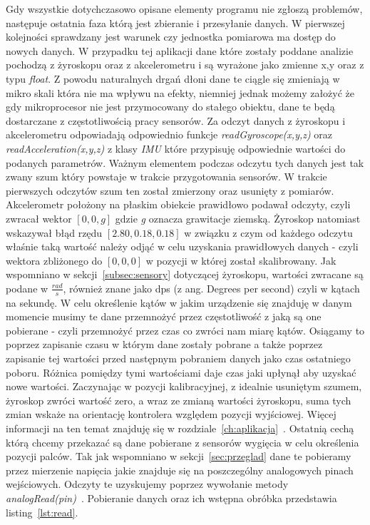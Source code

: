 Gdy wszystkie dotychczasowo opisane elementy programu nie zgłoszą problemów, następuje ostatnia faza którą jest zbieranie i przesyłanie danych. W pierwszej kolejności sprawdzany jest warunek czy jednostka pomiarowa ma dostęp do nowych danych. W przypadku tej aplikacji dane które zostały poddane analizie pochodzą z żyroskopu oraz z akcelerometru i są wyrażone jako zmienne x,y oraz z typu \textit{float}. Z powodu naturalnych drgań dłoni dane te ciągle się zmieniają w mikro skali która nie ma wpływu na efekty, niemniej jednak możemy założyć że gdy mikroprocesor nie jest przymocowany do stałego obiektu, dane te będą dostarczane z częstotliwością pracy sensorów. Za odczyt danych z żyroskopu i akcelerometru odpowiadają odpowiednio funkcje \textit{readGyroscope(x,y,z)} oraz \textit{readAcceleration(x,y,z)} z klasy \textit{IMU} które przypisuję odpowiednie wartości do podanych parametrów. Ważnym elementem podczas odczytu tych danych jest tak zwany szum który powstaje w trakcie przygotowania sensorów. W trakcie pierwszych odczytów szum ten został zmierzony oraz usunięty z pomiarów. Akcelerometr położony na płaskim obiekcie prawidłowo podawał odczyty, czyli zwracał wektor $[0,0,g]$ gdzie \textit{g} oznacza grawitacje ziemską. Żyroskop natomiast wskazywał błąd rzędu $[2.80,0.18,0.18]$ w związku  z czym od każdego odczytu właśnie taką wartość należy odjąć w celu uzyskania prawidłowych danych - czyli wektora zbliżonego do $[0,0,0]$ w pozycji w której został skalibrowany. Jak wspomniano w sekcji~\ref{subsec:sensory} dotyczącej żyroskopu, wartości zwracane są podane w $\frac{rad}{s}$, również znane jako dps (z ang. Degrees per second) czyli w kątach na sekundę. W celu określenie kątów w jakim urządzenie się znajduję w danym momencie musimy te dane przemnożyć przez częstotliwość z jaką są one pobierane - czyli przemnożyć przez czas co zwróci nam miarę kątów. Osiągamy to poprzez zapisanie czasu w którym dane zostały pobrane a także poprzez zapisanie tej wartości przed następnym pobraniem danych jako czas ostatniego poboru. Różnica pomiędzy tymi wartościami daje czas jaki upłynął aby uzyskać nowe wartości. Zaczynając w pozycji kalibracyjnej, z idealnie usuniętym szumem, żyroskop zwróci wartość zero, a wraz ze zmianą wartości żyroskopu, suma tych zmian wskaże na orientację kontrolera względem pozycji wyjściowej. Więcej informacji na ten temat znajduję się w rozdziale~\ref{ch:aplikacja}~\cite{gimbal}. Ostatnią cechą którą chcemy przekazać są dane pobierane z sensorów wygięcia w celu określenia pozycji palców. Tak jak wspomniano w sekcji~\ref{sec:przeglad} dane te pobieramy przez mierzenie napięcia jakie znajduje się na poszczególny analogowych pinach wejściowych. Odczyty te uzyskujemy poprzez wywołanie metody \textit{analogRead(pin)}~\cite{ArduinoDoc}. Pobieranie danych oraz ich wstępna obróbka przedstawia listing~\ref{lst:read}. \newpage
